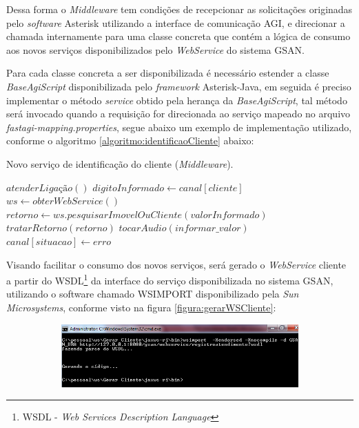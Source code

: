 Dessa forma o \textit{Middleware} tem condições de recepcionar as solicitações originadas pelo \textit{software} Asterisk utilizando a interface de comunicação AGI, e direcionar a chamada internamente para uma classe concreta que contém a lógica de consumo aos novos serviços disponibilizados pelo \textit{WebService} do sistema GSAN.

Para cada classe concreta a ser disponibilizada é necessário estender a classe \textit{BaseAgiScript} disponibilizada pelo \textit{framework} Asterisk-Java, em seguida é preciso implementar o método \textit{service} obtido pela herança da \textit{BaseAgiScript}, tal método será invocado quando a requisição for direcionada ao serviço mapeado no arquivo \textit{fastagi-mapping.properties}, segue abaixo um exemplo de implementação utilizado, conforme o algoritmo \ref{algoritmo:identificaoCliente} abaixo:


\begin{algorithm}
	\caption{Novo serviço de identificação do cliente (\textit{Middleware}).}	
	\label{algoritmo:identificaoCliente}
	\begin{algorithmic}[1]
		\STATE $atenderLigação()$ 		
		\STATE $digitoInformado \gets canal[cliente]$ 	
		\STATE $ws \gets obterWebService() $ 
		\STATE $retorno \gets ws.pesquisarImovelOuCliente(valorInformado) $
		\STATE $ tratarRetorno(retorno) $
		\ELSE		
		\STATE $ tocarAudio(informar\_valor) $
		\STATE $ canal[situacao] \leftarrow erro $
		\ENDIF		
	\end{algorithmic}
\end{algorithm}


Visando facilitar o consumo dos novos serviços, será gerado o \textit{WebService} cliente a partir do WSDL\footnote{WSDL - \textit{Web Services Description Language}} da interface do serviço disponibilizada no sistema GSAN, utilizando o software chamado WSIMPORT disponibilizado pela \textit{Sun Microsystems}, conforme visto na figura \ref{figura:gerarWSCliente}:

\begin{figure}[H]
	\centering
	\caption{Geração do código fonte para consumo do WebService.}	
	\label{figura:gerarWSCliente}
	\begin{subfigure}[H]{\textwidth}
		\centering
		\includegraphics{figuras/gerar_wscliente.png}
	\end{subfigure}
\end{figure}

